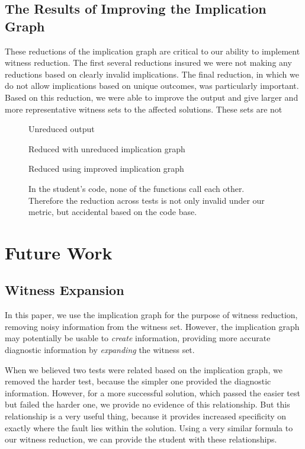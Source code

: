 \documentclass[11pt,twoside]{article}
\begin{document}
\subsection{The Results  of Improving the Implication Graph}

These reductions of the implication graph are critical to our ability to implement witness reduction. The first several reductions insured we were not making any reductions based on clearly invalid implications. The final reduction, in which we do not allow implications based on unique outcomes, was particularly important. Based on this reduction, we were able to improve the output and give larger and more representative witness sets to the affected solutions. These sets are not 

\begin{figure}

\caption{Unreduced output}

\caption{Reduced with unreduced implication graph}

\caption{Reduced using improved implication graph}
\caption{In the student's code, none of the functions call each other. Therefore the reduction across tests is not only invalid under our metric, but accidental based on the code base.}
\end{figure}

\section{Future Work}
\subsection{Witness Expansion}

In this paper, we use the implication graph for the purpose of witness reduction, removing noisy information from the witness set. However, the implication graph may potentially be usable to \emph{create} information, providing more accurate diagnostic information by \emph{expanding} the witness set. 

When we believed two tests were related based on the implication graph, we removed the harder test, because the simpler one provided the diagnostic information. However, for a more successful solution, which passed the easier test but failed the harder one, we provide no evidence of this relationship. But this relationship is a very useful thing, because it provides increased specificity on exactly where the fault lies within the solution. Using a very similar formula to our witness reduction, we can provide the student with these relationships.
\end{document}
